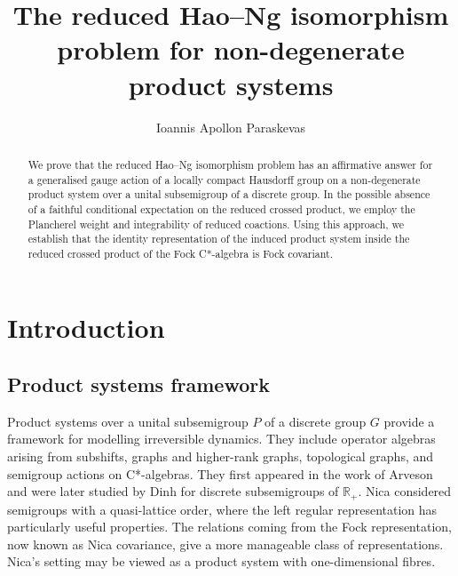 \documentclass[11pt,final]{amsart}
\numberwithin{equation}{section}
\theoremstyle{plain}
\theoremstyle{definition}
\theoremstyle{remark}
\newcommand{\bR}{\mathbb{R}}
\begin{document}
\title[The reduced Hao--Ng isomorphism problem for product systems]{The reduced Hao--Ng isomorphism problem for non-degenerate product systems}

\author[I.A. Paraskevas]{Ioannis Apollon Paraskevas}
\address{Department of Mathematics\\ National and Kapodistrian University of Athens\\ Athens\\ 157 84\\ Greece}


\begin{abstract}
We prove that the reduced Hao--Ng isomorphism problem has an affirmative answer for a generalised gauge action of a locally compact Hausdorff group on a non-degenerate product system over a unital subsemigroup of a discrete group. In the possible absence of a faithful conditional expectation on the reduced crossed product, we employ the Plancherel weight and integrability of reduced coactions. Using this approach, we establish that the identity representation of the induced product system inside the reduced crossed product of the Fock C*-algebra is Fock covariant.
\end{abstract}

\maketitle

\section{Introduction}

\subsection{Product systems framework}

Product systems over a unital subsemigroup $P$ of a discrete group $G$ provide a framework for modelling irreversible dynamics. They include operator algebras arising from subshifts, graphs and higher-rank graphs, topological graphs, and semigroup actions on C*-algebras. They first appeared in the work of Arveson \cite{Arv89} and were later studied by Dinh \cite{Din91} for discrete subsemigroups of $\bR_+$. Nica \cite{Nic92} considered semigroups with a quasi-lattice order, where the left regular representation has particularly useful properties. The relations coming from the Fock representation, now known as Nica covariance, give a more manageable class of representations. Nica's setting may be viewed as a product system with one-dimensional fibres.
\end{document}
